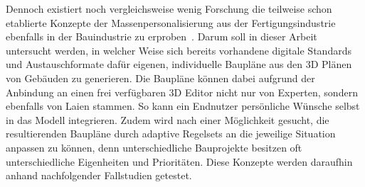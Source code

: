 Dennoch existiert noch vergleichsweise wenig Forschung die teilweise schon etablierte Konzepte der Massenpersonalisierung aus der Fertigungsindustrie ebenfalls in der Bauindustrie zu erproben~\cite{Larsen2019}.
Darum soll in dieser Arbeit untersucht werden, in welcher Weise sich bereits vorhandene digitale Standards und Austauschformate dafür eigenen, individuelle Baupläne aus den 3D Plänen von Gebäuden zu generieren.
Die Baupläne können dabei aufgrund der Anbindung an einen frei verfügbaren 3D Editor nicht nur von Experten, sondern ebenfalls von Laien stammen.
So kann ein Endnutzer persönliche Wünsche selbst in das Modell integrieren.
Zudem wird nach einer Möglichkeit gesucht, die resultierenden Baupläne durch adaptive Regelsets an die jeweilige Situation anpassen zu können, denn unterschiedliche Bauprojekte besitzen oft unterschiedliche Eigenheiten und Prioritäten.
Diese Konzepte werden daraufhin anhand nachfolgender Fallstudien getestet.